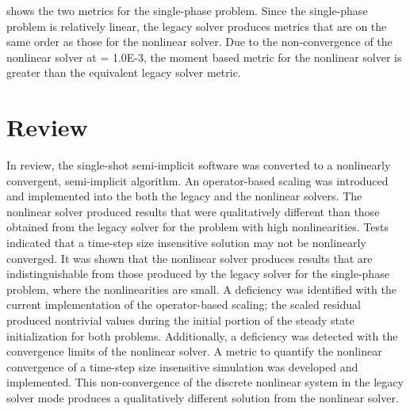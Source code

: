 shows the two metrics for the single-phase problem.
Since the single-phase problem is relatively linear, the legacy solver produces metrics that are on the same order as those for the nonlinear solver.
Due to the non-convergence of the nonlinear solver at \dtmax{} = 1.0E-3, the moment based metric for the nonlinear solver is greater than the equivalent legacy solver metric.

\section{Review}
\label{sect:review}

In review, the single-shot semi-implicit \cobra{} software was converted to a nonlinearly convergent, semi-implicit algorithm.
An operator-based scaling was introduced and implemented into the both the legacy and the nonlinear \cobra{} solvers.
The nonlinear solver produced results that were qualitatively different than those obtained from the legacy solver for the problem with high nonlinearities.
Tests indicated that a time-step size insensitive solution may not be nonlinearly converged.
It was shown that the nonlinear solver produces results that are indistinguishable from those produced by the legacy solver for the single-phase problem,  where the nonlinearities are small.
A deficiency was identified with the current implementation of the operator-based scaling; the scaled residual produced nontrivial values during the initial portion of the steady state initialization for both problems.
Additionally, a deficiency was detected with the convergence limits of the nonlinear solver.
A metric to quantify the nonlinear convergence of a time-step size insensitive simulation was developed and implemented.
This non-convergence of the discrete nonlinear system in the legacy solver mode produces a qualitatively different solution from the nonlinear solver.